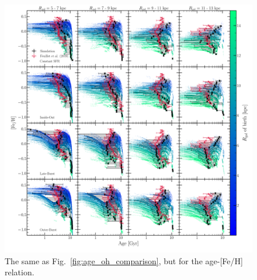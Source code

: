 \documentclass[a4paper, fleqn, usenatbib, useAMS]{mnras}
\begin{document}
\begin{figure} 
\centering 
\includegraphics[scale = 0.32]{age_feh_comparison.pdf} 
\caption{The same as Fig.~\ref{fig:age_oh_comparison}, but for the age-[Fe/H] 
relation. } 
\label{fig:age_feh_comparison} 
\end{figure} 
\end{document}
